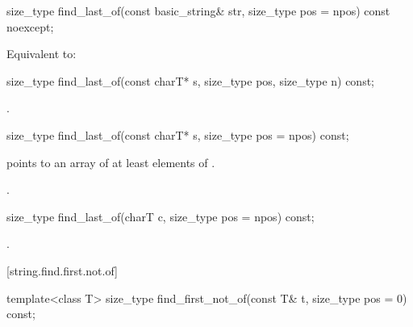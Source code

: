%
\begin{itemdecl}
size_type find_last_of(const basic_string& str, size_type pos = npos) const noexcept;
\end{itemdecl}

\begin{itemdescr}
\pnum
\effects
Equivalent to: 
\end{itemdescr}

%
\begin{itemdecl}
size_type find_last_of(const charT* s, size_type pos, size_type n) const;
\end{itemdecl}

\begin{itemdescr}
\pnum
\returns
{}.
\end{itemdescr}

%
\begin{itemdecl}
size_type find_last_of(const charT* s, size_type pos = npos) const;
\end{itemdecl}

\begin{itemdescr}
\pnum
\requires {} points to an array of at least 
elements of .

\pnum
\returns
{}.
\end{itemdescr}

%
\begin{itemdecl}
size_type find_last_of(charT c, size_type pos = npos) const;
\end{itemdecl}

\begin{itemdescr}
\pnum
\returns
{}.
\end{itemdescr}

[string.find.first.not.of]{}

%
\begin{itemdecl}
template<class T>
  size_type find_first_not_of(const T& t, size_type pos = 0) const;
\end{itemdecl}

